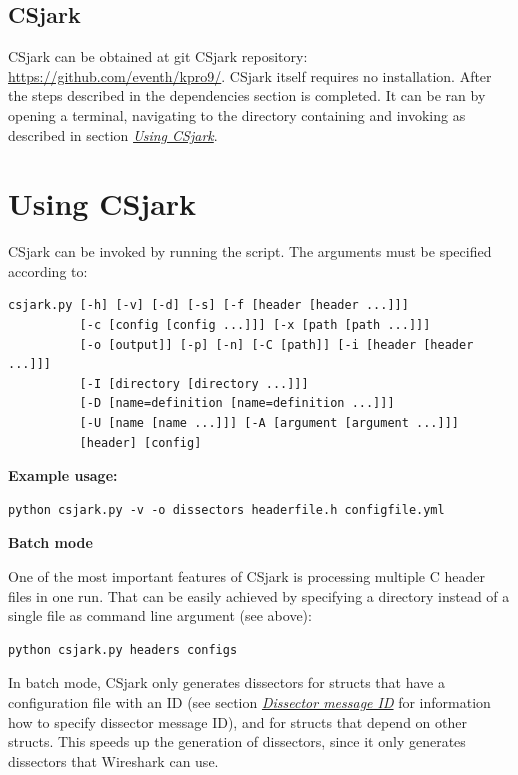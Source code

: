 \documentclass[A4paper,10pt,english]{sphinxmanual}
\begin{document}
\subsection{CSjark}
\label{user/install:csjark}
CSjark can be obtained at git CSjark repository: \href{https://github.com/eventh/kpro9/}{https://github.com/eventh/kpro9/}.
CSjark itself requires no installation. After the steps described in the dependencies section is completed. It can be ran by opening a terminal, navigating to the directory containing  and invoking as described in section {\hyperref[user/use:use]{\emph{Using CSjark}}}.


\section{Using CSjark}
\label{user/use:using-csjark}\label{user/use:use}\label{user/use::doc}
CSjark can be invoked by running the  script. The arguments must be specified according to:

\begin{Verbatim}[commandchars=\\\{\}]
csjark.py [-h] [-v] [-d] [-s] [-f [header [header ...]]]
          [-c [config [config ...]]] [-x [path [path ...]]]
          [-o [output]] [-p] [-n] [-C [path]] [-i [header [header ...]]]
          [-I [directory [directory ...]]]
          [-D [name=definition [name=definition ...]]]
          [-U [name [name ...]]] [-A [argument [argument ...]]]
          [header] [config]
\end{Verbatim}

\textbf{Example usage:}

\begin{Verbatim}[commandchars=\\\{\}]
python csjark.py -v -o dissectors headerfile.h configfile.yml
\end{Verbatim}

\textbf{Batch mode}

One of the most important features of CSjark is processing multiple C header files in one run. That can be easily achieved by specifying a directory instead of a single file as command line argument (see above):

\begin{Verbatim}[commandchars=\\\{\}]
python csjark.py headers configs
\end{Verbatim}

In batch mode, CSjark only generates dissectors for structs that have a configuration file with an ID (see section {\hyperref[user/config:ids]{\emph{Dissector message ID}}} for information how to specify dissector message ID), and for structs that depend on other structs. This speeds up the generation of dissectors, since it only generates dissectors that Wireshark can use.
\end{document}
